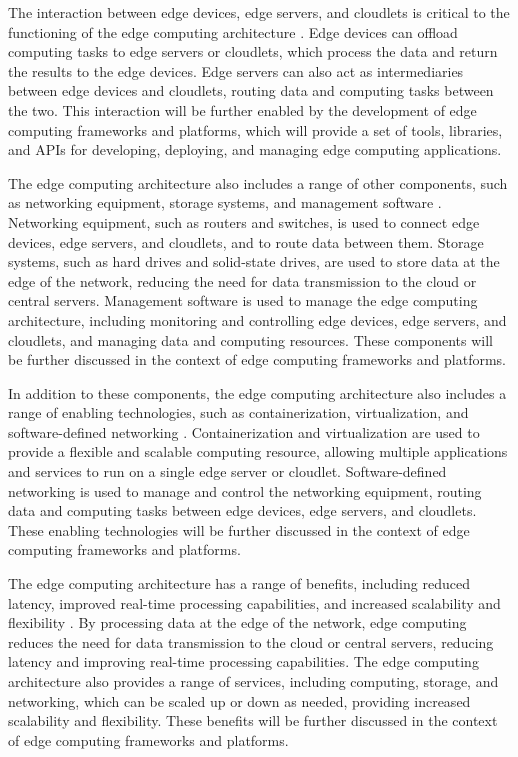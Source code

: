 \documentclass[11pt]{article}
\begin{document}
The interaction between edge devices, edge servers, and cloudlets is critical to the functioning of the edge computing architecture \cite{ref30}. Edge devices can offload computing tasks to edge servers or cloudlets, which process the data and return the results to the edge devices. Edge servers can also act as intermediaries between edge devices and cloudlets, routing data and computing tasks between the two. This interaction will be further enabled by the development of edge computing frameworks and platforms, which will provide a set of tools, libraries, and APIs for developing, deploying, and managing edge computing applications.

The edge computing architecture also includes a range of other components, such as networking equipment, storage systems, and management software \cite{ref31}. Networking equipment, such as routers and switches, is used to connect edge devices, edge servers, and cloudlets, and to route data between them. Storage systems, such as hard drives and solid-state drives, are used to store data at the edge of the network, reducing the need for data transmission to the cloud or central servers. Management software is used to manage the edge computing architecture, including monitoring and controlling edge devices, edge servers, and cloudlets, and managing data and computing resources. These components will be further discussed in the context of edge computing frameworks and platforms.

In addition to these components, the edge computing architecture also includes a range of enabling technologies, such as containerization, virtualization, and software-defined networking \cite{ref32}. Containerization and virtualization are used to provide a flexible and scalable computing resource, allowing multiple applications and services to run on a single edge server or cloudlet. Software-defined networking is used to manage and control the networking equipment, routing data and computing tasks between edge devices, edge servers, and cloudlets. These enabling technologies will be further discussed in the context of edge computing frameworks and platforms.

The edge computing architecture has a range of benefits, including reduced latency, improved real-time processing capabilities, and increased scalability and flexibility \cite{ref1}. By processing data at the edge of the network, edge computing reduces the need for data transmission to the cloud or central servers, reducing latency and improving real-time processing capabilities. The edge computing architecture also provides a range of services, including computing, storage, and networking, which can be scaled up or down as needed, providing increased scalability and flexibility. These benefits will be further discussed in the context of edge computing frameworks and platforms.
\end{document}
